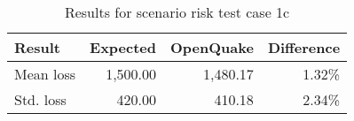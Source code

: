 \begin{table}[htbp]

\centering
\begin{tabular}{ l r r r }

\hline
\rowcolor{anti-flashwhite}
\bf{Result} & \bf{Expected} & \bf{OpenQuake} & \bf{Difference}\\
\hline
Mean loss & 1,500.00 & 1,480.17 & 1.32\% \\
Std. loss & 420.00 & 410.18 & 2.34\% \\
\hline
\end{tabular}

\caption{Results for scenario risk test case 1c}
\label{tab:result-sr-1c}
\end{table}